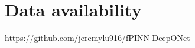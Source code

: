 \documentclass[11pt]{article}
\begin{document}
\section*{Data availability}
\url{https://github.com/jeremylu916/fPINN-DeepONet}

\end{document}
